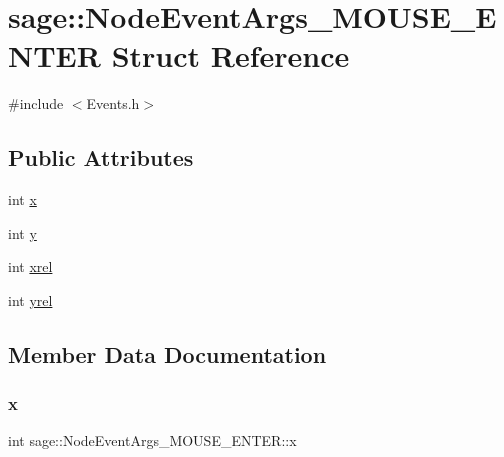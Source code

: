 \hypertarget{structsage_1_1NodeEventArgs__MOUSE__ENTER}{}\section{sage\+::Node\+Event\+Args\+\_\+\+M\+O\+U\+S\+E\+\_\+\+E\+N\+T\+ER Struct Reference}
\label{structsage_1_1NodeEventArgs__MOUSE__ENTER}


{\ttfamily \#include $<$Events.\+h$>$}

\subsection*{Public Attributes}
\begin{DoxyCompactItemize}
\item 
int \mbox{\hyperlink{structsage_1_1NodeEventArgs__MOUSE__ENTER_a2df0f74b28ea8e1366deb0d866ac3587}{x}}
\item 
int \mbox{\hyperlink{structsage_1_1NodeEventArgs__MOUSE__ENTER_ad00b8a1036a9cace990e55ed419fbfae}{y}}
\item 
int \mbox{\hyperlink{structsage_1_1NodeEventArgs__MOUSE__ENTER_a325b8896a7e0c6d95e35d5c1edc363a5}{xrel}}
\item 
int \mbox{\hyperlink{structsage_1_1NodeEventArgs__MOUSE__ENTER_a8ef24c0b4df8f36993621d4ef7921488}{yrel}}
\end{DoxyCompactItemize}


\subsection{Member Data Documentation}
\mbox{\label{structsage_1_1NodeEventArgs__MOUSE__ENTER_a2df0f74b28ea8e1366deb0d866ac3587}} 
\subsubsection{\texorpdfstring{x}{x}}
{\footnotesize\ttfamily int sage\+::\+Node\+Event\+Args\+\_\+\+M\+O\+U\+S\+E\+\_\+\+E\+N\+T\+E\+R\+::x}

\mbox{\label{structsage_1_1NodeEventArgs__MOUSE__ENTER_a325b8896a7e0c6d95e35d5c1edc363a5}} 

